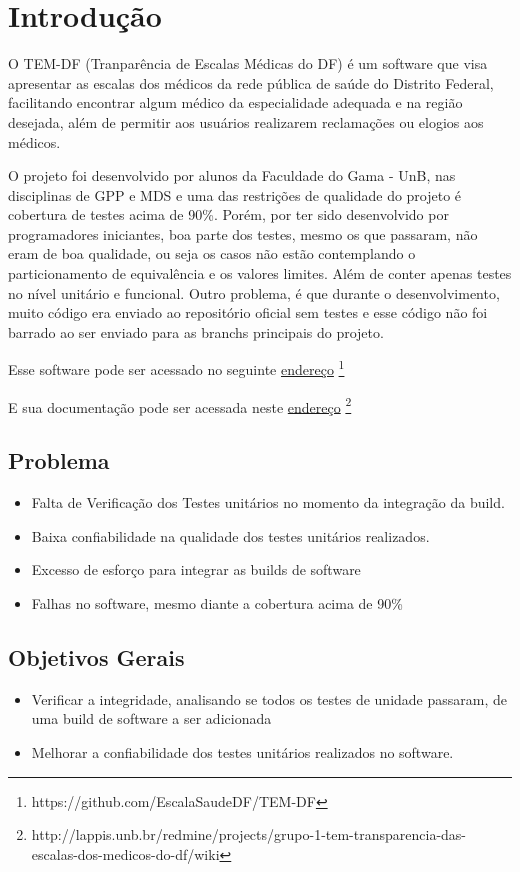 \chapter[Introdução]{Introdução}

O TEM-DF (Tranparência de Escalas Médicas do DF) é um software que visa apresentar as escalas dos médicos da rede pública de saúde do Distrito Federal, facilitando encontrar algum médico da especialidade adequada e na região desejada, além de permitir aos usuários realizarem reclamações ou elogios aos médicos.


O projeto foi desenvolvido por alunos da Faculdade do Gama - UnB, nas disciplinas de GPP e MDS e uma das restrições de qualidade do projeto é cobertura de testes acima de 90\%. Porém, por ter sido desenvolvido por programadores iniciantes, boa parte dos testes, mesmo os que passaram, não eram de boa qualidade, ou seja os casos não estão contemplando o particionamento de equivalência e os valores limites. Além de conter apenas testes no nível unitário e funcional. Outro problema, é que durante o desenvolvimento, muito código era enviado ao repositório oficial sem testes e esse código não foi barrado ao ser enviado para as branchs principais do projeto.


Esse software pode ser acessado no seguinte \href{https://github.com/EscalaSaudeDF/TEM-DF}{endereço}%
\footnote{https://github.com/EscalaSaudeDF/TEM-DF}

E sua documentação pode ser acessada neste \href{http://lappis.unb.br/redmine/projects/grupo-1-tem-transparencia-das-escalas-dos-medicos-do-df/wiki}{endereço}%
\footnote{http://lappis.unb.br/redmine/projects/grupo-1-tem-transparencia-das-escalas-dos-medicos-do-df/wiki}


\section{Problema}
\begin{itemize}
\item Falta de Verificação dos Testes unitários no momento da integração da build.
\item Baixa confiabilidade na qualidade dos testes unitários realizados.
\item Excesso de esforço para integrar as builds de software
\item Falhas no software, mesmo diante a cobertura acima de 90\%
\end{itemize}

\section{Objetivos Gerais}
\begin{itemize}
    \item Verificar a integridade, analisando se todos os testes de unidade passaram, de uma build de software a ser adicionada
    \item Melhorar a confiabilidade dos testes unitários realizados no software.
\end{itemize}

